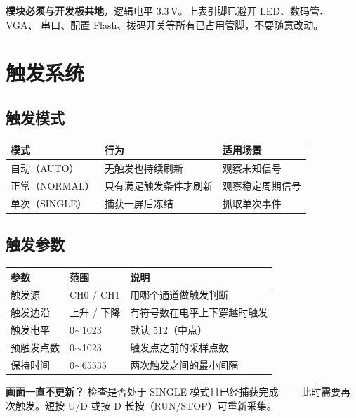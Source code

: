 \documentclass[UTF8,a4paper,11pt]{ctexart}
\begin{document}
\begin{tipbox}
\textbf{模块必须与开发板共地}，逻辑电平 3.3\,V。上表引脚已避开 LED、数码管、VGA、
串口、配置 Flash、拨码开关等所有已占用管脚，不要随意改动。
\end{tipbox}


\section{触发系统}

\subsection{触发模式}

\begin{center}
\small
\begin{tabular}{lll}
\toprule
模式 & 行为 & 适用场景\\
\midrule
自动（AUTO） & 无触发也持续刷新 & 观察未知信号\\
正常（NORMAL） & 只有满足触发条件才刷新 & 观察稳定周期信号\\
单次（SINGLE） & 捕获一屏后冻结 & 抓取单次事件\\
\bottomrule
\end{tabular}
\end{center}

\subsection{触发参数}

\begin{center}
\small
\begin{tabular}{lll}
\toprule
参数 & 范围 & 说明\\
\midrule
触发源 & CH0 / CH1 & 用哪个通道做触发判断\\
触发边沿 & 上升 / 下降 & 有符号数在电平上下穿越时触发\\
触发电平 & 0$\sim$1023 & 默认 512（中点）\\
预触发点数 & 0$\sim$1023 & 触发点之前的采样点数\\
保持时间 & 0$\sim$65535 & 两次触发之间的最小间隔\\
\bottomrule
\end{tabular}
\end{center}

\begin{tipbox}
\textbf{画面一直不更新？} 检查是否处于 SINGLE 模式且已经捕获完成——
此时需要再次触发。短按 U/D 或按 D 长按（RUN/STOP）可重新采集。
\end{tipbox}
\end{document}
